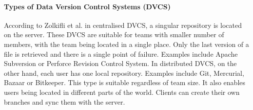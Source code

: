 \paragraph{Types of Data Version Control Systems (DVCS)}
According to Zolkifli et al. \cite{zolkifli2018version} in centralised DVCS, a
singular repository is located on the server. These DVCS are suitable for teams
with smaller number of members, with the team being located in a single place.
Only the last version of a file is retrieved and there is a single point of
failure. Examples include Apache Subversion or Perforce Revision Control System.
In distributed DVCS, on the other hand, each user has one local repository.
Examples include Git, Mercurial, Bazaar or Bitkeeper. This type is suitable
regardless of team size. It also enables users being located in different parts
of the world. Clients can create their own branches and sync them with the
server.